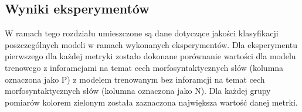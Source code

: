 \newpage %
\subsection{Wyniki eksperymentów}

W ramach tego rozdziału umieszczone są dane dotyczące jakości klasyfikacji poszczególnych modeli w ramach wykonanych eksperymentów. Dla eksperymentu pierwszego dla każdej metryki zostało dokonane porównanie wartości dla modelu trenowego z inforamcjami na temat cech morfosyntaktycznych słów (kolumna oznaczona jako P) z modelem trenowanym bez inforamcji na temat cech morfosyntaktycznych słów (kolumna oznaczona jako N). Dla każdej grupy pomiarów kolorem zielonym została zaznaczona największa wartość danej metrki.





